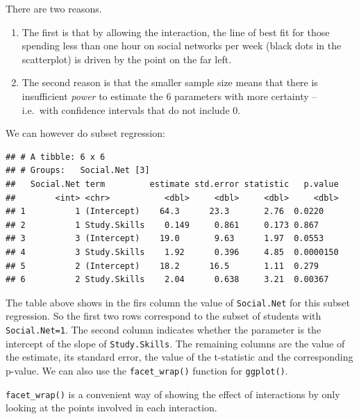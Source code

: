 \documentclass[
]{gitbook}
\providecommand{\tightlist}{%
  \setlength{\itemsep}{0pt}\setlength{\parskip}{0pt}}
\begin{document}
There are two reasons.

\begin{enumerate}
\def\labelenumi{\arabic{enumi}.}
\tightlist
\item
  The first is that by allowing the interaction, the line of best fit for those spending less than one hour on social networks per week (black dots in the scatterplot) is driven by the point on the far left.
\item
  The second reason is that the smaller sample size means that there is insufficient \emph{power} to estimate the 6 parameters with more certainty -- i.e.~with confidence intervals that do not include 0.
\end{enumerate}

We can however do subset regression:

\begin{verbatim}
## # A tibble: 6 x 6
## # Groups:   Social.Net [3]
##   Social.Net term         estimate std.error statistic   p.value
##        <int> <chr>           <dbl>     <dbl>     <dbl>     <dbl>
## 1          1 (Intercept)    64.3      23.3       2.76  0.0220   
## 2          1 Study.Skills    0.149     0.861     0.173 0.867    
## 3          3 (Intercept)    19.0       9.63      1.97  0.0553   
## 4          3 Study.Skills    1.92      0.396     4.85  0.0000150
## 5          2 (Intercept)    18.2      16.5       1.11  0.279    
## 6          2 Study.Skills    2.04      0.638     3.21  0.00367
\end{verbatim}

The table above shows in the firs column the value of \texttt{Social.Net} for this subset regression. So the first two rows correspond to the subset of students with \texttt{Social.Net=1}. The second column indicates whether the parameter is the intercept of the slope of \texttt{Study.Skills}. The remaining columns are the value of the estimate, its standard error, the value of the t-statistic and the corresponding p-value. We can also use the \texttt{facet\_wrap()} function for \texttt{ggplot()}.

\texttt{facet\_wrap()} is a convenient way of showing the effect of interactions by only looking at the points involved in each interaction.
\end{document}
